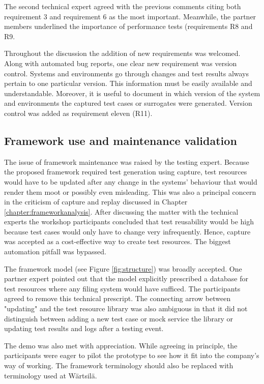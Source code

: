 \documentclass[12pt,a4paper,oneside,pdftex]{report}
\begin{document}
{%
The second technical expert agreed with the previous comments citing both requirement 3 and requirement 6 as the most important. Meanwhile, the partner members underlined the importance of performance tests (requirements R8 and R9.

Throughout the discussion the addition of new requirements was welcomed. Along with automated bug reports, one clear new requirement was version control. Systems and environments go through changes and test results always pertain to one particular version. This information must be easily available and understandable. Moreover, it is useful to document in which version of the system and environments the captured test cases or surrogates were generated. Version control was added as requirement eleven (R11).

\subsection{Framework use and maintenance validation}

The issue of framework maintenance was raised by the testing expert. Because the proposed framework required test generation using capture, test resources would have to be updated after any change in the systems' behaviour that would render them moot or possibly even misleading. This was also a principal concern in the criticism of capture and replay discussed in Chapter \ref{chapter:frameworkanalysis}. After discussing the matter with the technical experts the workshop participants concluded that test reusability would be high because test cases would only have to change very infrequently. Hence, capture was accepted as a cost-effective way to create test resources. The biggest automation pitfall was bypassed.

The framework model (see Figure \ref{fig:structure}) was broadly accepted. One partner expert pointed out that the model explicitly prescribed a database for test resources where any filing system would have sufficed. The participants agreed to remove this technical prescript. The connecting arrow between "updating" and the test resource library was also ambiguous in that it did not distinguish between adding a new test case or mock service the library or updating test results and logs after a testing event.

The demo was also met with appreciation. While agreeing in principle, the participants were eager to pilot the prototype to see how it fit into the company's way of working. The framework terminology should also be replaced with terminology used at Wärtsilä.

}
\end{document}
